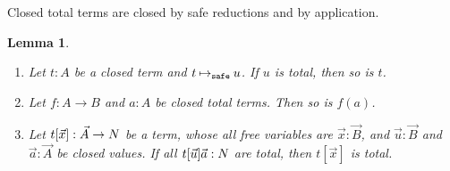 \documentclass{article}
\newtheorem{lemma}[theorem]{Lemma}
\begin{document}
Closed total terms are closed by safe reductions and by application. 

\begin{lemma}\label{lem:total_value}
  \begin{enumerate}
  \item\label{lem:total_value1}
    Let $t:A$ be a closed term and $t \mathbin{{\mapsto}_{\tiny \tt safe}} u$.
    If $u$ is total, then so is $t$.
  \item\label{lem:total_value2}
    Let $f:A \rightarrow B$ and $a:A$ be closed \emph{total} terms.
    Then so is $f(a)$.
  \item\label{lem:total_value3}
    Let $t[\vec{x}]:\vec{A}\rightarrow{N}$ be a term,
    whose all free variables are $\vec{x}:\vec{B}$,
    and $\vec{u}:\vec{B}$ and $\vec{a}:\vec{A}$ be closed values.
    If all $t[\vec{u}]\vec{a}:{N}$ are total, then $t[\vec{x}]$ is total. 
  \end{enumerate}
\end{lemma}
\end{document}
